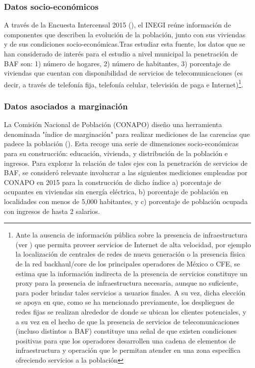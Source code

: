 \documentclass[9pt,twocolumn,twoside]{ilcss}
\begin{document}
\subsubsection{Datos socio-económicos}
A través de la Encuesta Intercensal 2015 (\cite{Intercensal2015}), el INEGI reúne información de componentes que describen la evolución de la población, junto con sus viviendas y de sus condiciones socio-económicas.Tras estudiar esta fuente, los datos que se han considerado de interés para el estudio a nivel municipal la penetración de BAF son: 1) número de hogares, 2) número de habitantes, 3) porcentaje de viviendas que cuentan con disponibilidad de servicios de telecomunicaciones (es decir, a través de telefonía fija, telefonía celular, televisión de paga e Internet)\footnote{Ante la ausencia de información pública sobre la presencia de infraestructura (ver \cite{IFT2017reb}) que permita proveer servicios de Internet de alta velocidad, por ejemplo la localización de centrales de redes de nueva generación o la presencia física de la red backhaul/core de los principales operadores de México o CFE, se estima que la información indirecta de la presencia de servicios constituye un proxy para la presencia de infraestructura necesaria, aunque no suficiente, para poder brindar tales servicios a usuarios finales. A su vez, dicha elección se apoya en que, como se ha mencionado previamente, los despliegues de redes fijas se realizan alrededor de donde se ubican los clientes potenciales, y a su vez en el hecho de que la presencia de servicios de telecomunicaciones (incluso distintos a BAF) constituye una señal de que existen condiciones positivas para que los operadores desarrollen una cadena de elementos de infraestructura y operación que le permitan atender en una zona específica ofreciendo servicios a la población}. 


\subsubsection{Datos asociados a marginación}

La Comisión Nacional de Población (CONAPO) diseño una herramienta denominada "índice de marginación" para realizar mediciones de las carencias que padece la población (\cite{CONAPO2015}). Esta recoge una serie de dimensiones socio-económicas para su construcción: educación, vivienda, y distribución de la población e ingresos. Para explorar la relación de tales ejes con la penetración de servicios de BAF, se consideró relevante involucrar a las siguientes mediciones empleadas por CONAPO en 2015 para la construcción de dicho índice a) porcentaje de ocupantes en viviendas sin energía eléctrica, b) porcentaje de población en localidades con menos de 5,000 habitantes, y c) porcentaje de población ocupada con ingresos de hasta 2 salarios.
\end{document}
